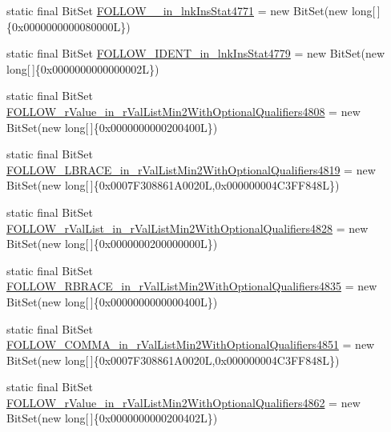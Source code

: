 \begin{DoxyCompactItemize}
\item 
static final Bit\-Set \hyperlink{classorg_1_1tzi_1_1use_1_1parser_1_1shell_1_1_shell_command_parser_afbb7d43ea3d7e0c6d93b1b12fa3251ce}{F\-O\-L\-L\-O\-W\-\_\-\_\-in\-\_\-lnk\-Ins\-Stat4771} = new Bit\-Set(new long\mbox{[}$\,$\mbox{]}\{0x0000000000080000\-L\})
\item 
static final Bit\-Set \hyperlink{classorg_1_1tzi_1_1use_1_1parser_1_1shell_1_1_shell_command_parser_af520e81a2c13c5721de25e5d96ebd7df}{F\-O\-L\-L\-O\-W\-\_\-\-I\-D\-E\-N\-T\-\_\-in\-\_\-lnk\-Ins\-Stat4779} = new Bit\-Set(new long\mbox{[}$\,$\mbox{]}\{0x0000000000000002\-L\})
\item 
static final Bit\-Set \hyperlink{classorg_1_1tzi_1_1use_1_1parser_1_1shell_1_1_shell_command_parser_a3988e4fd8de3a0ec7e34f571746c617d}{F\-O\-L\-L\-O\-W\-\_\-r\-Value\-\_\-in\-\_\-r\-Val\-List\-Min2\-With\-Optional\-Qualifiers4808} = new Bit\-Set(new long\mbox{[}$\,$\mbox{]}\{0x0000000000200400\-L\})
\item 
static final Bit\-Set \hyperlink{classorg_1_1tzi_1_1use_1_1parser_1_1shell_1_1_shell_command_parser_ade1c4de0fdf186b2fcd449d2cfaba71c}{F\-O\-L\-L\-O\-W\-\_\-\-L\-B\-R\-A\-C\-E\-\_\-in\-\_\-r\-Val\-List\-Min2\-With\-Optional\-Qualifiers4819} = new Bit\-Set(new long\mbox{[}$\,$\mbox{]}\{0x0007\-F308861\-A0020\-L,0x000000004\-C3\-F\-F848\-L\})
\item 
static final Bit\-Set \hyperlink{classorg_1_1tzi_1_1use_1_1parser_1_1shell_1_1_shell_command_parser_a74125486bb3d9ea13a9f6433b290ed6d}{F\-O\-L\-L\-O\-W\-\_\-r\-Val\-List\-\_\-in\-\_\-r\-Val\-List\-Min2\-With\-Optional\-Qualifiers4828} = new Bit\-Set(new long\mbox{[}$\,$\mbox{]}\{0x0000000200000000\-L\})
\item 
static final Bit\-Set \hyperlink{classorg_1_1tzi_1_1use_1_1parser_1_1shell_1_1_shell_command_parser_a3a2ed2f9daf81eb431909a860942102f}{F\-O\-L\-L\-O\-W\-\_\-\-R\-B\-R\-A\-C\-E\-\_\-in\-\_\-r\-Val\-List\-Min2\-With\-Optional\-Qualifiers4835} = new Bit\-Set(new long\mbox{[}$\,$\mbox{]}\{0x0000000000000400\-L\})
\item 
static final Bit\-Set \hyperlink{classorg_1_1tzi_1_1use_1_1parser_1_1shell_1_1_shell_command_parser_aef7a4ae2dae8395efb53a3a7029d3867}{F\-O\-L\-L\-O\-W\-\_\-\-C\-O\-M\-M\-A\-\_\-in\-\_\-r\-Val\-List\-Min2\-With\-Optional\-Qualifiers4851} = new Bit\-Set(new long\mbox{[}$\,$\mbox{]}\{0x0007\-F308861\-A0020\-L,0x000000004\-C3\-F\-F848\-L\})
\item 
static final Bit\-Set \hyperlink{classorg_1_1tzi_1_1use_1_1parser_1_1shell_1_1_shell_command_parser_af3750b8df99356eb292bc05dbc05f52b}{F\-O\-L\-L\-O\-W\-\_\-r\-Value\-\_\-in\-\_\-r\-Val\-List\-Min2\-With\-Optional\-Qualifiers4862} = new Bit\-Set(new long\mbox{[}$\,$\mbox{]}\{0x0000000000200402\-L\})

\end{DoxyCompactItemize}
